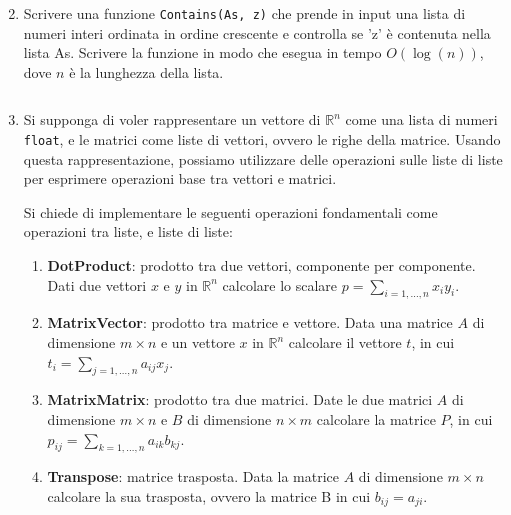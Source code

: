 \documentclass[11pt,a4]{article}
\newcommand{\mybox}[2]{$\quad$\fbox{
\begin{minipage}{#1cm}
\hfill\vspace{#2cm}
\end{minipage}
}}
\begin{document}
\begin{enumerate}
\mybox{15}{2.75}

\item Scrivere una funzione {\tt Contains(As, z)} che prende in input una lista di numeri interi ordinata in ordine crescente
e controlla se 'z' è contenuta nella lista As. Scrivere la funzione in modo che esegua in tempo $O(\log(n))$, dove
$n$ è la lunghezza della lista.

\mybox{15}{2.75}


\item Si supponga di voler rappresentare un vettore di $\mathbb{R}^n$ come una lista di numeri {\tt float},
e le matrici come liste di vettori, ovvero le righe della matrice.
Usando questa rappresentazione, possiamo utilizzare delle operazioni sulle liste di liste per esprimere
operazioni base tra vettori e matrici. 

Si chiede di implementare le seguenti operazioni fondamentali come operazioni tra liste, e liste di liste:

\begin{enumerate}
\item {\bf DotProduct}: prodotto tra due vettori, componente per componente. Dati due vettori $x$ e $y$ in $\mathbb{R}^n$
calcolare lo scalare $p=\sum_{i = 1,\dots,n} x_i y_i$.
\item {\bf MatrixVector}: prodotto tra matrice e vettore. Data una matrice $A$ di dimensione $m \times n$ e un vettore $x$ in $\mathbb{R}^n$ calcolare il vettore $t$, in cui $t_i=\sum_{j = 1,\dots,n} a_{ij} x_j$.
\item {\bf MatrixMatrix}: prodotto tra due matrici. Date le due matrici $A$ di dimensione $m \times n$ e $B$ di dimensione $n \times m$ calcolare la matrice $P$, in cui $p_{ij}=\sum_{k = 1,\dots,n} a_{ik} b_{kj}$.
\item {\bf Transpose}: matrice trasposta. Data la matrice $A$ di dimensione $m \times n$ calcolare la sua trasposta,
ovvero la matrice B in cui $b_{ij} = a_{ji}$.

\end{enumerate}

\mybox{15}{8}


\end{enumerate}
\end{document}
